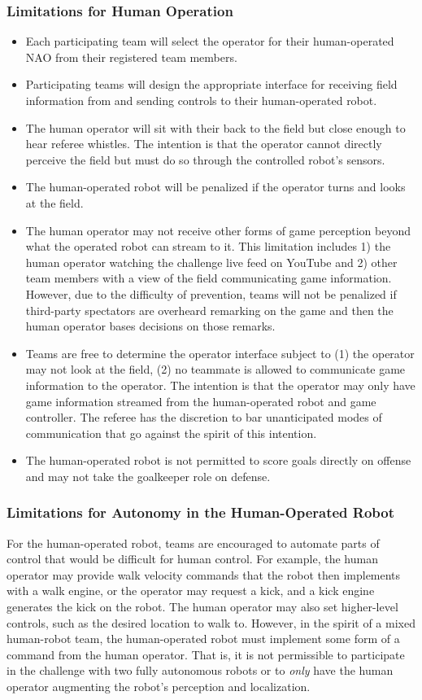 \subsubsection{Limitations for Human Operation}
\begin{itemize}
	\item Each participating team will select the operator for their human-operated NAO from their registered team members.
	\item Participating teams will design the appropriate interface for receiving field information from and sending controls to their human-operated robot.
	\item The human operator will sit with their back to the field but close enough to hear referee whistles. The intention is that the operator cannot directly perceive the field but must do so through the controlled robot’s sensors.
	\item The human-operated robot will be penalized if the operator turns and looks at the field.
	\item The human operator may not receive other forms of game perception beyond what the operated robot can stream to it. This limitation includes 1) the human operator watching the challenge live feed on YouTube and 2) other team members with a view of the field communicating game information. However, due to the difficulty of prevention, teams will not be penalized if third-party spectators are overheard remarking on the game and then the human operator bases decisions on those remarks.
	\item Teams are free to determine the operator interface subject to (1) the operator may not look at the field, (2) no teammate is allowed to communicate game information to the operator. The intention is that the operator may only have game information streamed from the human-operated robot and game controller. The referee has the discretion to bar unanticipated modes of communication that go against the spirit of this intention. 
	\item The human-operated robot is not permitted to score goals directly on offense and may not take the goalkeeper role on defense.
\end{itemize}

\subsubsection{Limitations for Autonomy in the Human-Operated Robot}

For the human-operated robot, teams are encouraged to automate parts of control that would be difficult for human control. For example, the human operator may provide walk velocity commands that the robot then implements with a walk engine, or the operator may request a kick, and a kick engine generates the kick on the robot. The human operator may also set higher-level controls, such as the desired location to walk to. However, in the spirit of a mixed human-robot team, the human-operated robot must implement some form of a command from the human operator. That is, it is not permissible to participate in the challenge with two fully autonomous robots or to \textit{only} have the human operator augmenting the robot's perception and localization. 


